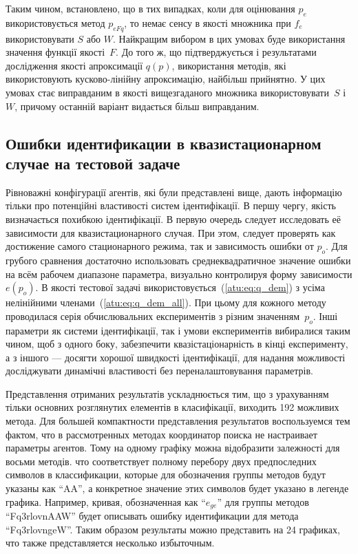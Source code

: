 Таким чином, встановлено, що в тих випадках, коли для оцінювання $p_e$ використовується
метод $p_{eFq}$, то немає сенсу в якості множника при $f_e$
використовувати $S$ або $W$. Найкращим вибором в цих умовах буде
використання значення функції якості~$F$. До того ж, що підтверджується і
результатами дослідження якості апроксимації $q(p)$, використання методів,
які використовують кусково-лінійну апроксимацію, найбільш прийнятно. У цих
умовах стає виправданим в якості вищезгаданого множника використовувати~$S$
і~$W$, причому останній варіант видається більш виправданим.


\subsection{Ошибки идентификации в квазистационарном случае на тестовой задаче}  %

Рівноважні конфігурації агентів, які були представлені вище, дають інформацію тільки про
потенційні властивості систем ідентифікації.
В першу чергу, якість визначається похибкою ідентифікації.
%
В первую очередь следует исследовать её зависимости для квазистационарного случая.
При этом, следует проверять как достижение самого стационарного режима,
так и зависимость ошибки от $p_o$. Для грубого сравнения достаточно
использовать среднеквадратичное значение ошибки на всём рабочем диапазоне параметра,
визуально контролируя форму зависимости $e(p_o)$.
%
В якості тестової задачі
використовується~(\ref{atu:eq:q_dem}) з усіма нелінійними членами~(\ref{atu:eq:q_dem_all}).
При цьому для кожного методу
проводилася серія обчислювальних експериментів з різним значенням~$p_o$. Інші
параметри як системи ідентифікації, так і умови експериментів вибиралися таким
чином, щоб з одного боку, забезпечити квазістаціонарність в кінці експерименту, а
з іншого --- досягти хорошої швидкості ідентифікації, для надання можливості
досліджувати динамічні властивості без переналаштовування параметрів.

Представлення отриманих результатів ускладнюється тим, що з урахуванням тільки
основних розглянутих елементів в класифікації, виходить 192 можливих метода.
%
Для большей компактности представления результатов
воспользуемся тем фактом, что в рассмотренных методах
координатор поиска не настраивает параметры агентов.
%
Тому на одному графіку можна відобразити залежності для восьми методів.
%
что соответствует полному перебору
двух предпоследних символов в классификации,
которые для обозначения группы методов будут
указаны как ``AA'', а конкретное значение этих символов
будет указано в легенде графика. Например,
кривая, обозначенная как ``$e_{ge}$'' для группы методов
``Fq3rlovnAAW'' будет описывать
ошибку идентификации для метода ``Fq3rlovngeW''.
Таким образом результаты можно представить на 24 графиках,
что также представляется несколько избыточным.

